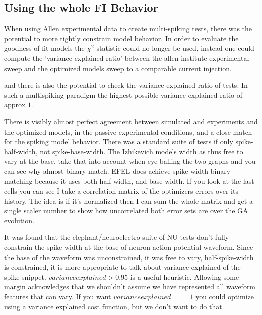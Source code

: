 \subsection{Using the whole FI Behavior}

When using Allen experimental data to create multi-spiking tests, there was the potential to more tightly constrain model behavior. In order to evaluate the goodness of fit models the $\chi^{2}$ statistic could no longer be used, instead one could compute the 'variance explained ratio' between the allen institute experimental sweep and the optimized models sweep to a comparable current injection.

and there is also the potential to check the variance explained ratio of tests. In such a multispiking paradigm the highest possible variance explained ratio of approx $1$. 


There is visibly almost perfect  agreement between simulated and experiments and the optimized models, in the passive experimental conditions, and a close match for the spiking model behavior. There was a standard suite of tests if only spike-half-width, not spike-base-width. The Izhikevich models width as thus free to vary at the base, take that into account when eye balling the two graphs and you can see why almost binary match. EFEL does achieve spike width binary matching because it uses both half-width, and base-width. If you look at the last cells you can see I take a correlation matrix of the optimizers errors over its history. The idea is if it's normalized then I can sum the whole matrix and get a single scaler number to show how uncorrelated both error sets are over the GA evolution. 

It was found that the elephant/neuroelectro-suite of NU tests don't fully constrain the spike width at the base of neuron action potential waveform. Since the base of the waveform was unconstrained, it was free to vary, half-spike-width is constrained, it is more appropriate to talk about variance explained of the spike snippet. $variance explained>0.95$ is a useful heuristic. Allowing some margin acknowledges that we shouldn't assume we have represented all waveform features that can vary. If you want $variance explained==1$   
you could optimize using a variance explained 
cost function, but we don't want to do that.